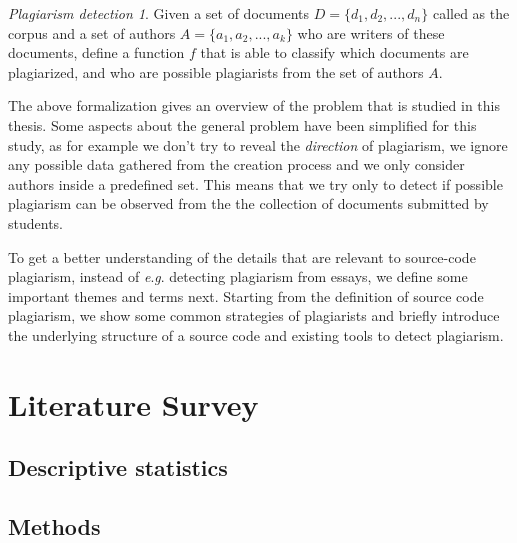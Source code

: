\documentclass[english, grading]{tktltiki2}
\newcommand{\eg}{\textit{e}.\textit{g}. }
\theoremstyle{definition}
\theoremstyle{remark}
\numberwithin{equation}{section} %
\begin{document}
\newtheorem*{sc-plg}{Plagiarism detection}
\begin{sc-plg}
Given a set of documents $D = \{d_1, d_2, ..., d_n\}$ called as the corpus and a set of authors $A = \{a_1, a_2, ..., a_k\}$ who are writers of these documents, define a function $f$ that is able to classify which documents are plagiarized, and who are possible plagiarists from the set of authors $A$.
\end{sc-plg}

\noindent
The above formalization gives an overview of the problem that is studied in this thesis. Some aspects about the general problem have been simplified for this study, as for example we don't try to reveal the \emph{direction} of plagiarism, we ignore any possible data gathered from the creation process and we only consider authors inside a predefined set. This means that we try only to detect if possible plagiarism can be observed from the the collection of documents submitted by students. 

To get a better understanding of the details that are relevant to source-code plagiarism, instead of \eg detecting plagiarism from essays, we define some important themes and terms next. Starting from the definition of source code plagiarism, we show some common strategies of plagiarists and briefly introduce the underlying structure of a source code and existing tools to detect plagiarism.



\section{Literature Survey} \label{chap-liter-review}


\subsection{Descriptive statistics} \label{subsec-liter-data}


\subsection{Methods} \label{chap-liter-review-methods}


%
\end{document}
